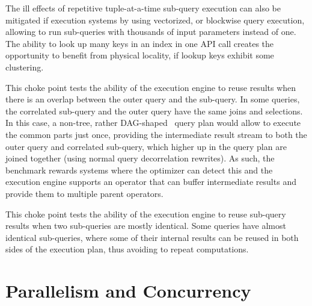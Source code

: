 The ill effects of repetitive tuple-at-a-time sub-query execution can also be mitigated if execution systems by using vectorized, or blockwise query execution, allowing to run sub-queries with thousands of input parameters instead of one.
The ability to look up many keys in an index in one API call creates the opportunity to benefit from physical locality, if lookup keys exhibit some clustering.





This choke point tests the ability of the execution engine to reuse results when there is an overlap between the outer query and the sub-query. In some queries, the correlated sub-query and the outer query have the same joins and selections.
In this case, a non-tree, rather DAG-shaped~\cite{DBLP:conf/btw/NeumannM09} query plan would allow to execute the common parts just once, providing the intermediate result stream to both the outer query and correlated sub-query,
which higher up in the query plan are joined together (using normal query decorrelation rewrites).
As such, the benchmark rewards systems where the optimizer can detect this and the execution engine supports an operator that can buffer intermediate results and provide them to multiple parent operators.





This choke point tests the ability of the execution engine to reuse sub-query results when two sub-queries are mostly identical.
Some queries have almost identical sub-queries, where some of their internal results can be reused in both sides of the execution plan, thus avoiding to repeat computations.




\section{Parallelism and Concurrency}

